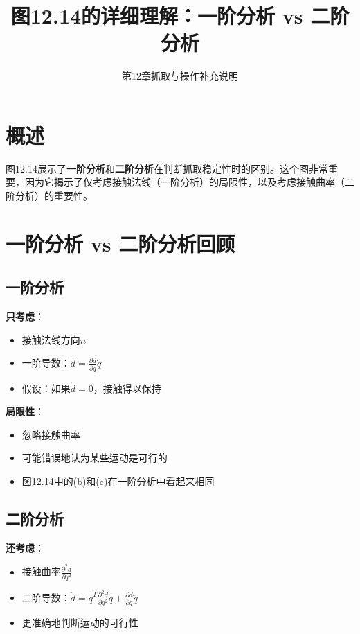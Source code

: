 \documentclass[12pt,a4paper]{article}
\title{图12.14的详细理解：一阶分析 vs 二阶分析}
\author{第12章抓取与操作补充说明}
\date{}
\begin{document}
\maketitle

\section{概述}

图12.14展示了\textbf{一阶分析}和\textbf{二阶分析}在判断抓取稳定性时的区别。这个图非常重要，因为它揭示了仅考虑接触法线（一阶分析）的局限性，以及考虑接触曲率（二阶分析）的重要性。

\section{一阶分析 vs 二阶分析回顾}

\subsection{一阶分析}

\textbf{只考虑}：
\begin{itemize}
\item 接触法线方向$\hat{n}$
\item 一阶导数：$\dot{d} = \frac{\partial d}{\partial q} \dot{q}$
\item 假设：如果$\dot{d} = 0$，接触得以保持
\end{itemize}

\textbf{局限性}：
\begin{itemize}
\item 忽略接触曲率
\item 可能错误地认为某些运动是可行的
\item 图12.14中的(b)和(c)在一阶分析中看起来相同
\end{itemize}

\subsection{二阶分析}

\textbf{还考虑}：
\begin{itemize}
\item 接触曲率$\frac{\partial^2 d}{\partial q^2}$
\item 二阶导数：$\ddot{d} = \dot{q}^T \frac{\partial^2 d}{\partial q^2} \dot{q} + \frac{\partial d}{\partial q} \ddot{q}$
\item 更准确地判断运动的可行性
\end{itemize}
\end{document}
